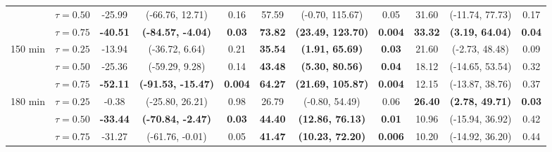 \begin{table}[ht]
{\begin{tabular}{llccccccccc}
 & $\tau=0.50$ & -25.99 & (-66.76, 12.71) & 0.16 & 57.59 & (-0.70, 115.67) & 0.05 & 31.60 & (-11.74, 77.73) & 0.17 \\
 & $\tau=0.75$ & \textbf{-40.51} & \textbf{(-84.57, -4.04)} & \textbf{0.03} & \textbf{73.82} & \textbf{(23.49, 123.70)} & \textbf{0.004} & \textbf{33.32} & \textbf{(3.19, 64.04)} & \textbf{0.04} \\
\midrule
\multirow{3}{*}{150 min} & $\tau=0.25$ & -13.94 & (-36.72, 6.64) & 0.21 & \textbf{35.54} & \textbf{(1.91, 65.69)} & \textbf{0.03} & 21.60 & (-2.73, 48.48) & 0.09 \\
 & $\tau=0.50$ & -25.36 & (-59.29, 9.28) & 0.14 & \textbf{43.48} & \textbf{(5.30, 80.56)} & \textbf{0.04} & 18.12 & (-14.65, 53.54) & 0.32 \\
 & $\tau=0.75$ & \textbf{-52.11} & \textbf{(-91.53, -15.47)} & \textbf{0.004} & \textbf{64.27} & \textbf{(21.69, 105.87)} & \textbf{0.004} & 12.15 & (-13.87, 38.76) & 0.37 \\
\midrule
\multirow{3}{*}{180 min} & $\tau=0.25$ & -0.38 & (-25.80, 26.21) & 0.98 & 26.79 & (-0.80, 54.49) & 0.06 & \textbf{26.40} & \textbf{(2.78, 49.71)} & \textbf{0.03} \\
 & $\tau=0.50$ & \textbf{-33.44} & \textbf{(-70.84, -2.47)} & \textbf{0.03} & \textbf{44.40} & \textbf{(12.86, 76.13)} & \textbf{0.01} & 10.96 & (-15.94, 36.92) & 0.42 \\
 & $\tau=0.75$ & -31.27 & (-61.76, -0.01) & 0.05 & \textbf{41.47} & \textbf{(10.23, 72.20)} & \textbf{0.006} & 10.20 & (-14.92, 36.20) & 0.44 \\
\bottomrule
\end{tabular}%
}
\end{table}

